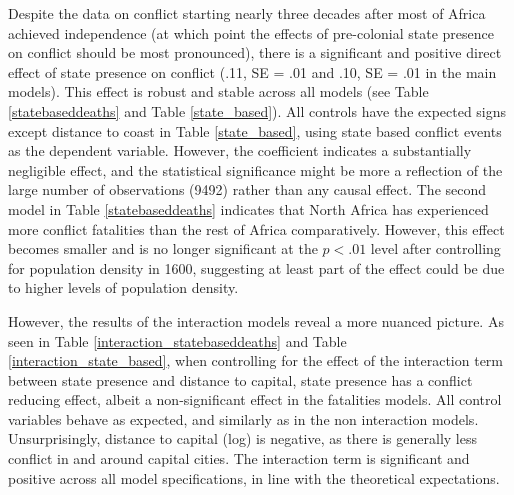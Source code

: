 \documentclass[12pt]{article}
\begin{document}
Despite the data on conflict starting nearly three decades after most of Africa
achieved independence (at which point the effects of pre-colonial state presence
on conflict should be most pronounced), there is a significant
and positive direct effect of state presence on conflict (.11, SE = .01 and .10,
SE = .01 in the main models). This effect is robust and stable across all models
(see Table \ref{statebaseddeaths} and Table \ref{state_based}). All controls
have the expected signs except distance to coast in Table \ref{state_based},
using state based conflict events as the dependent variable. However, the
coefficient indicates a substantially negligible effect, and the statistical
significance might be more a reflection of the large number of observations
(9492) rather than any causal effect. The second model in Table
\ref{statebaseddeaths} indicates that North Africa has experienced more conflict
fatalities than the rest of Africa comparatively. However, this effect becomes
smaller and is no longer significant at the $ p < .01 $ level after controlling
for population density in 1600, suggesting at least part of the effect could be
due to higher levels of population density.

However, the results of the interaction models reveal a more nuanced picture. As
seen in Table \ref{interaction_statebaseddeaths} and Table
\ref{interaction_state_based}, when controlling for the effect of the
interaction term between state presence and distance to capital, state presence
has a conflict reducing effect, albeit a non-significant effect in the
fatalities models. All control variables behave as expected, and similarly as in
the non interaction models. Unsurprisingly, distance to capital (log) is
negative, as there is generally less conflict in and around capital cities. The
interaction term is significant and positive across all model specifications, in
line with the theoretical expectations. 
\end{document}
